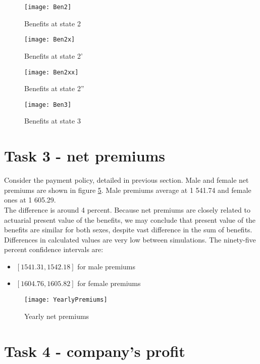 \documentclass[11pt,wide]{mwart}
\begin{document}
\begin{figure}[!htbp]
	\caption{Benefits at state 2}
	\label{Ben2}
	\texttt{[image: Ben2]}
	\centering
\end{figure}


\begin{figure}[!htbp]
	\caption{Benefits at state 2'}
	\label{Ben2x}
	\texttt{[image: Ben2x]}
	\centering
\end{figure}

\begin{figure}[!htbp]
	\caption{Benefits at state 2''}
	\label{Ben2xx}
	\texttt{[image: Ben2xx]}
	\centering
\end{figure}


\begin{figure}[!htbp]
	\caption{Benefits at state 3}
	\label{Ben3}
	\texttt{[image: Ben3]}
	\centering
\end{figure}


\newpage

\section{Task 3 - net premiums}

Consider the payment policy, detailed in previous section. Male and female net premiums are shown in figure \ref{YearlyPremiums}. Male premiums average at 1 541.74 and female ones at 1 605.29.\\
The difference is around 4 percent. Because net premiums are closely related to actuarial present value of the benefits, we may conclude that present value of the benefits are similar for both sexes, despite vast difference in the sum of benefits.\\
Differences in calculated values are very low between simulations. The ninety-five percent confidence intervals are:
\begin{itemize}
	\item $[1 541.31, 1 542.18 ]$ for male premiums
	\item $ [1 604.76, 1 605.82 ]$ for female premiums
\end{itemize}

\begin{figure}[!htbp]
	\caption{Yearly net premiums}
	\label{YearlyPremiums}
	\texttt{[image: YearlyPremiums]}
	\centering
\end{figure}

\newpage

\section{Task 4 - company's profit}
\end{document}
